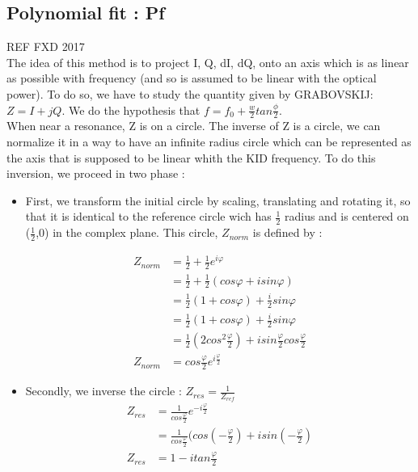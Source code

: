 \documentclass[english,11pt]{report}
\begin{document}
\subsection{Polynomial fit : Pf}
REF FXD 2017\\

The idea of this method is to project I, Q, dI, dQ, onto an axis which is as linear as possible with frequency (and so is assumed to be linear with the optical power). To do so, we have to study the quantity given by GRABOVSKIJ: $Z = I + jQ$. We do the hypothesis that $f=f_{0} +\frac{w}{2} tan\frac{\phi}{2}$.\\
When near a resonance, Z is on a circle. The inverse of Z is a circle, we can normalize it in a way to have an infinite radius circle which can be represented as the axis that is supposed to be linear whith the KID frequency. To do this inversion, we proceed in two phase : 

\begin{itemize}
\item First, we transform the initial circle by scaling, translating and rotating it, so that it is identical to the reference circle wich has $\frac{1}{2}$ radius and is centered on ($\frac{1}{2}$,0) in the complex plane. This circle, $Z_{norm}$ is defined by :

\begin{equation}
\begin{split}
Z_{norm} & = \frac{1}{2} + \frac{1}{2}e^{i\varphi} \\
& =  \frac{1}{2} + \frac{1}{2} (cos\varphi + isin\varphi) \\
 & = \frac{1}{2}(1+cos\varphi) + \frac{i}{2} sin\varphi \\
 & = \frac{1}{2} (1+ cos\varphi) +\frac{i}{2} sin\varphi \\
  & = \frac{1}{2} (2cos^{2}\frac{\varphi}{2}) + i sin\frac{\varphi}{2}cos\frac{\varphi}{2} \\
  Z_{norm}  & = cos\frac{\varphi}{2}  e^{i\frac{\varphi}{2}}
\end{split}
\label{Znorm}
\end{equation}

\item Secondly, we inverse the circle : $Z_{res} = \frac{1}{Z_{ref}}$
\begin{equation}
\begin{split}
Z_{res} & = \frac{1}{cos\frac{\varphi}{2}}  e^{-i\frac{\varphi}{2}}\\
 & = \frac{1}{cos\frac{\varphi}{2}}(cos(-\frac{\varphi}{2}) + isin(-\frac{\varphi}{2})\\
 Z_{res}& = 1 - i tan\frac{\varphi}{2}
\end{split}
\label{Zres}
\end{equation}
\end{itemize}
\end{document}
